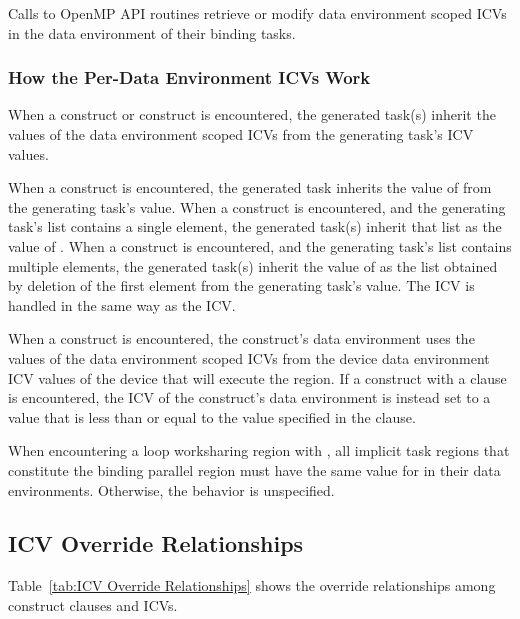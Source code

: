Calls to OpenMP API routines retrieve or modify data environment scoped ICVs in the 
data environment of their binding tasks.










\subsubsection{How the Per-Data Environment ICVs Work}
\label{subsubsec:How the Per-Data Environment ICVs Work}
When a  construct or  construct is encountered, the generated task(s)
inherit the values of the data environment scoped ICVs from the generating task's ICV
values.

When a  construct is encountered, the generated task inherits the value of
 from the generating task's  value. When a 
construct is encountered, and the generating task's  list contains a single
element, the generated task(s) inherit that list as the value of . When a
 construct is encountered, and the generating task's  list contains 
multiple elements, the generated task(s) inherit the value of  as the list 
obtained by deletion of the first element from the generating task's  value. 
The  ICV is handled in the same way as the  ICV.

When a  construct is encountered, the construct's data environment
uses the values of the data environment scoped ICVs from the device data environment ICV values of the device that will execute the region. 
If a  construct with a  clause is encountered, 
the  ICV of the construct's data environment is instead set to a value that is less than or equal to the value specified in the clause.  

When encountering a loop worksharing region with , all 
implicit task regions that constitute the binding parallel region must have the same value 
for  in their data environments. Otherwise, the behavior is unspecified.








\subsection{ICV Override Relationships}
\label{subsec:ICV Override Relationships}
Table~\ref{tab:ICV Override Relationships} shows the override relationships 
among construct clauses and ICVs.

